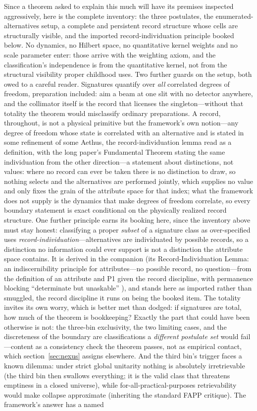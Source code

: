 \documentclass[11pt]{article}
\theoremstyle{definition}
\newcommand{\Aethus}{Aethus}
\begin{document}
Since a theorem asked to explain this much will have its premises inspected aggressively, here is the complete inventory: the three postulates, the enumerated-alternatives setup, a complete and persistent record structure whose cells are structurally visible, and the imported record-individuation principle booked below. No dynamics, no Hilbert space, no quantitative kernel weights and no scale parameter enter: those arrive with the weighting axiom, and the classification's independence is from the quantitative kernel, not from the structural visibility proper childhood uses. Two further guards on the setup, both owed to a careful reader. Signatures quantify over \emph{all} correlated degrees of freedom, preparation included: aim a beam at one slit with no detector anywhere, and the collimator itself is the record that licenses the singleton---without that totality the theorem would misclassify ordinary preparations. A record, throughout, is not a physical primitive but the framework's own notion---any degree of freedom whose state is correlated with an alternative and is stated in some refinement of some \Aethus{}, the record-individuation lemma read as a definition, with the long paper's Fundamental Theorem stating the same individuation from the other direction---a statement about distinctions, not values: where no record can ever be taken there is no distinction to draw, so nothing selects and the alternatives are performed jointly, which supplies no value and only fixes the grain of the attribute space for that index; what the framework does not supply is the dynamics that make degrees of freedom correlate, so every boundary statement is exact conditional on the physically realized record structure. One further principle earns its booking here, since the inventory above must stay honest: classifying a proper \emph{subset} of a signature class as over-specified uses \emph{record-individuation}---alternatives are individuated by possible records, so a distinction no information could ever support is not a distinction the attribute space contains. It is derived in the companion (its Record-Individuation Lemma: an indiscernibility principle for attributes---no possible record, no question---from the definition of an attribute and P1 given the record discipline, with permanence blocking ``determinate but unaskable'' \cite{Aethus}), and stands here as imported rather than smuggled, the record discipline it runs on being the booked item. The totality invites its own worry, which is better met than dodged: if signatures are total, how much of the theorem is bookkeeping? Exactly the part that could have been otherwise is not: the three-bin exclusivity, the two limiting cases, and the discreteness of the boundary are classifications a \emph{different postulate set} would fail---content as a consistency check the theorem passes, not as empirical contact, which section~\ref{sec:nexus} assigns elsewhere. And the third bin's trigger faces a known dilemma: under strict global unitarity nothing is absolutely irretrievable (the third bin then swallows everything; it is the valid class that threatens emptiness in a closed universe), while for-all-practical-purposes retrievability would make collapse approximate (inheriting the standard FAPP critique). The framework's answer has a named 
\end{document}
